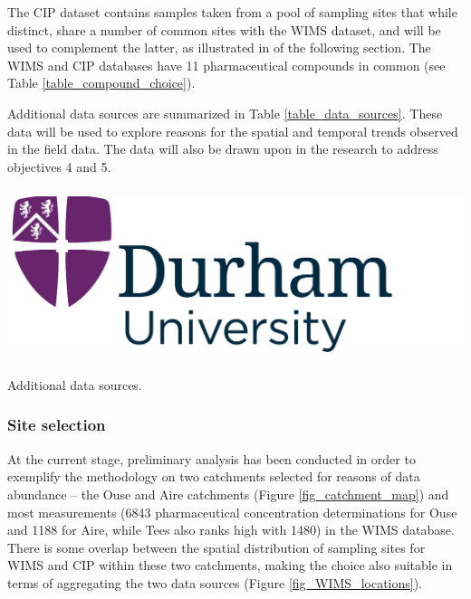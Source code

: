 \documentclass{article}
\begin{document}
The CIP dataset contains samples taken from a pool of sampling sites that while distinct, share a number of common sites with the WIMS dataset, and will be used to complement the latter, as illustrated in  of the following section. The WIMS and CIP databases have 11 pharmaceutical compounds in common (see Table \ref{table_compound_choice}). 

Additional data sources are summarized in  Table \ref{table_data_sources}. These data will be used to explore reasons for the spatial and temporal trends observed in the field data. The data will also be drawn upon in the research to address objectives 4 and 5.

\begin{table}
    \centering
    \includegraphics[height=5cm]{logo.png}
    \caption{Additional data sources.}
    \label{table_data_source}
\end{table}

\subsubsection{Site selection}

At the current stage, preliminary analysis has been conducted in order to exemplify the methodology on two catchments selected for reasons of data abundance – the Ouse and Aire catchments (Figure \ref{fig_catchment_map}) and most measurements (6843 pharmaceutical concentration determinations for Ouse and 1188 for Aire, while Tees also ranks high with 1480) in the WIMS database. There is some overlap between the spatial distribution of sampling sites for WIMS and CIP within these two catchments, making the choice also suitable in terms of aggregating the two data sources (Figure \ref{fig_WIMS_locations}).
\end{document}
